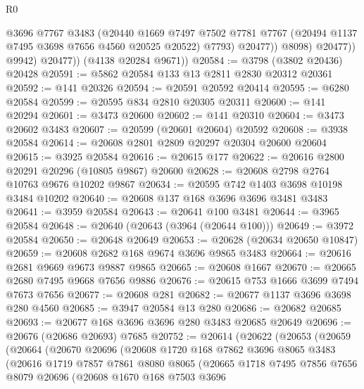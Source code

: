 \begin{lexlean}{R0}
\begin{coremodule}
                      @3696
                      @7767
                      @3483
                      (@20440
                        @1669
                        @7497
                        @7502
                        @7781
                        @7767
                        (@20494 @1137 @7495 @3698 @7656 @4560 @20525 @20522)
                        @7793)
                      @20477))
                  @8098)
                @20477))
            @9942)
          @20477))
      (@4138 @20284 @9671))
@20584 := @3798 (@3802 @20436) @20428
@20591 := @5862 @20584 @133 @13 @2811 @2830 @20312 @20361
@20592 := @141 @20326
@20594 := @20591 @20592 @20414
@20595 := @6280 @20584
@20599 := @20595 @834 @2810 @20305 @20311
@20600 := @141 @20294
@20601 := @3473 @20600
@20602 := @141 @20310
@20604 := @3473 @20602 @3483
@20607 := @20599 (@20601 @20604) @20592
@20608 := @3938 @20584
@20614 := @20608 @2801 @2809 @20297 @20304 @20600 @20604
@20615 := @3925 @20584
@20616 := @20615 @177
@20622 := @20616 @2800 @20291 @20296 (@10805 @9867) @20600
@20628 := @20608 @2798 @2764 @10763 @9676 @10202 @9867
@20634 := @20595 @742 @1403 @3698 @10198 @3484 @10202
@20640 := @20608 @137 @168 @3696 @3696 @3481 @3483
@20641 := @3959 @20584
@20643 := @20641 @100 @3481
@20644 := @3965 @20584
@20648 := @20640 (@20643 (@3964 (@20644 @100)))
@20649 := @3972 @20584
@20650 := @20648 @20649
@20653 := @20628 (@20634 @20650 @10847)
@20659 := @20608 @2682 @168 @9674 @3696 @9865 @3483
@20664 := @20616 @2681 @9669 @9673 @9887 @9865
@20665 := @20608 @1667
@20670 := @20665 @2680 @7495 @9668 @7656 @9886
@20676 := @20615 @753 @1666 @3699 @7494 @7673 @7656
@20677 := @20608 @281
@20682 := @20677 @1137 @3696 @3698 @280 @4560
@20685 := @3947 @20584 @13 @280
@20686 := @20682 @20685
@20693 := @20677 @168 @3696 @3696 @280 @3483 @20685 @20649
@20696 := @20676 (@20686 @20693) @7685
@20752 := @20614
    (@20622
      (@20653
        (@20659
          (@20664
            (@20670
              @20696
              (@20608
                @1720
                @168
                @7862
                @3696
                @8065
                @3483
                (@20616
                  @1719
                  @7857
                  @7861
                  @8080
                  @8065
                  (@20665
                    @1718
                    @7495
                    @7856
                    @7656
                    @8079
                    @20696
                    (@20608
                      @1670
                      @168
                      @7503
                      @3696

\end{coremodule}
\end{lexlean}
